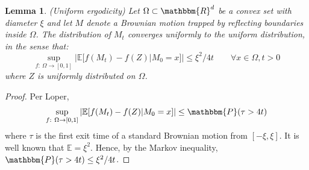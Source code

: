 \documentclass[nofootinbib,english, aip, jcp, priprint, graphicx,floatfix]{revtex4-1}
\newtheorem{lemma}{Lemma}
\theoremstyle{plain}
\theoremstyle{definition}
\theoremstyle{plain}
\begin{document}

\begin{lemma}
\label{lem:uniform_ergodicity}(Uniform ergodicity) Let $\Omega\subset\mathbbm{R}^d$ be a convex set with diameter $\xi$ and let $M$ denote a Brownian motion trapped by reflecting boundaries inside $\Omega$.  The distribution of $M_t$ converges uniformly to the uniform distribution, in the sense that:
%
\[ 
\sup_{f:\ \Omega\rightarrow [0,1]} | \mathbb{E}[f(M_t) - f(Z)|M_0=x]| \leq \xi^2/4t \qquad \forall x\in \Omega, t>0
\]
%
where $Z$ is uniformly distributed on $\Omega$.
\end{lemma}
\begin{proof}
Per Loper,\cite{Loper2018} 
\[
\sup_{f:\ \Omega\rightarrow [0,1]} | \mathbb{E}[f(M_t) - f(Z)|M_0=x]| \leq \mathbbm{P}(\tau>4t)
\]
where $\tau$ is the first exit time of a standard Brownian motion from $[-\xi,\xi]$. It is well known that $\mathbb{E}=\xi^2$. Hence, by the Markov inequality, $\mathbbm{P}(\tau>4t)\leq \xi^2/4t$.
\end{proof}
\end{document}
